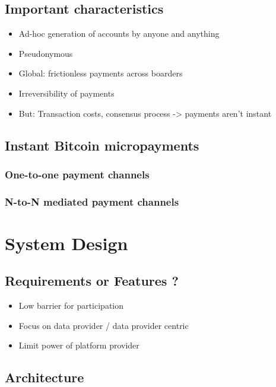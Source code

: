 \documentclass{sig-alternate}
\begin{document}
	\subsection{Important characteristics}
	\begin{itemize}
	\item Ad-hoc generation of accounts by anyone and anything
	\item Pseudonymous
	\item Global: frictionless payments across boarders
	\item Irreversibility of payments
	\item But: Transaction costs, consensus process -> payments aren't instant
	\end{itemize}

	\subsection{Instant Bitcoin micropayments}

    	\subsubsection{One-to-one payment channels}

		\subsubsection{N-to-N mediated payment channels}


\section{System Design}

	\subsection{Requirements or Features ?}
	\begin{itemize}
	\item Low barrier for participation
	\item Focus on data provider / data provider centric
	\item Limit power of platform provider
	\end{itemize}

	\subsection{Architecture}
\end{document}
